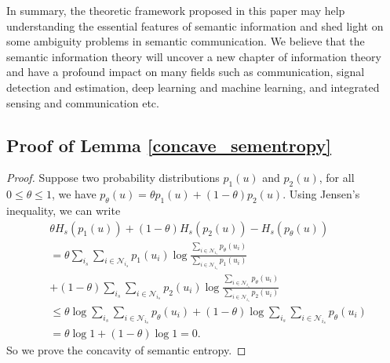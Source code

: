 \documentclass[12pt, draftclsnofoot,onecolumn]{IEEEtran}
\begin{document}
In summary, the theoretic framework proposed in this paper may help understanding the essential features of semantic information and shed light on some ambiguity problems in semantic communication. We believe that the semantic information theory will uncover a new chapter of information theory and have a profound impact on many fields such as communication, signal detection and estimation, deep learning and machine learning, and integrated sensing and communication etc.

\appendix
\subsection{Proof of Lemma \ref{concave_sementropy}}\label{proof_concave_sementropy}
\begin{proof}
Suppose two probability distributions $p_1(u)$ and $p_2(u)$, for all $0 \leq \theta \leq 1$, we have $p_{\theta}(u)=\theta p_1(u)+(1-\theta) p_2(u)$. Using Jensen's inequality, we can write
\begin{equation}
\begin{aligned}
&\theta H_s(p_1(u))+(1-\theta) H_s(p_2(u))-H_s(p_{\theta}(u))\\
&=\theta \sum_{i_s}\sum_{i\in\mathcal{N}_{i_s}}p_1(u_i) \log \frac{\sum_{i\in\mathcal{N}_{i_s}}p_{\theta}(u_i)}{\sum_{i\in\mathcal{N}_{i_s}}p_1(u_i)}\\
&+(1-\theta)\sum_{i_s}\sum_{i\in\mathcal{N}_{i_s}}p_2(u_i) \log \frac{\sum_{i\in\mathcal{N}_{i_s}}p_{\theta}(u_i)}{\sum_{i\in\mathcal{N}_{i_s}}p_2(u_i)}\\
&\leq \theta \log \sum_{i_s} \sum_{i\in\mathcal{N}_{i_s}}p_{\theta}(u_i) +(1-\theta) \log \sum_{i_s} \sum_{i\in\mathcal{N}_{i_s}}p_{\theta}(u_i)\\
&=\theta \log 1 + (1-\theta) \log 1 =0.
\end{aligned}
\end{equation}
So we prove the concavity of semantic entropy.
\end{proof}
\end{document}
